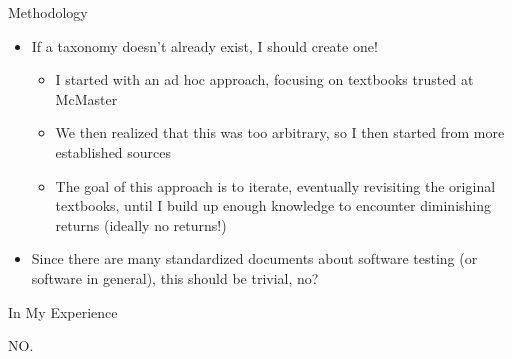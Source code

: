 \documentclass[22pt]{beamer}
\begin{document}
\begin{frame}[fragile]
\begin{textblock}{7.25}
        \begin{block}{\fontsize{37}{20}\selectfont Methodology}
            \begin{itemize}
                \item If a taxonomy doesn't already exist, I should create one!
                      \begin{itemize}
                          \item I started with an ad hoc approach, focusing on
                                textbooks trusted at McMaster \\\cite{Patton2006,
                                    PetersAndPedrycz2000, vanVliet2000}
                          \item We then realized that this was too arbitrary, so
                                I then started from more established sources \\
                                \cite{IEEE2022, SWEBOK2024, SWEBOK2014,
                                    IEEE2017, ISO_IEC2023a, ISTQB}
                          \item The goal of this approach is to iterate,
                                eventually revisiting the original textbooks,
                                until I build up enough knowledge to encounter
                                diminishing returns (ideally no returns!)
                      \end{itemize}
                \item Since there are many standardized documents about software
                      testing (or software in general), this should be trivial, no?
            \end{itemize}
            \vspace{5mm}
        \end{block}

        \begin{block}{\fontsize{37}{20}\selectfont In My Experience}
            \vspace{5mm}
            \begin{center}
                {\fontsize{185}{20}\selectfont NO.}
            \end{center}
            \vspace{5mm}
        \end{block}
    \end{textblock}


\end{frame}
\end{document}

